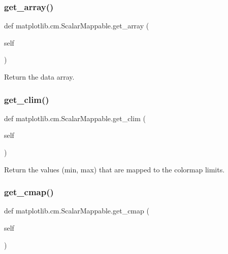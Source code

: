 \subsubsection{\texorpdfstring{get\+\_\+array()}{get\_array()}}
{\footnotesize\ttfamily def matplotlib.\+cm.\+Scalar\+Mappable.\+get\+\_\+array (\begin{DoxyParamCaption}\item[{}]{self }\end{DoxyParamCaption})}

\begin{DoxyVerb}Return the data array.\end{DoxyVerb}
 \mbox{\label{classmatplotlib_1_1cm_1_1ScalarMappable_a7d44743554ae7c7018cd88612c165ea0}} 
\subsubsection{\texorpdfstring{get\+\_\+clim()}{get\_clim()}}
{\footnotesize\ttfamily def matplotlib.\+cm.\+Scalar\+Mappable.\+get\+\_\+clim (\begin{DoxyParamCaption}\item[{}]{self }\end{DoxyParamCaption})}

\begin{DoxyVerb}Return the values (min, max) that are mapped to the colormap limits.
\end{DoxyVerb}
 \mbox{\label{classmatplotlib_1_1cm_1_1ScalarMappable_a64acb81e9faf893ea6bd3758367fd4e8}} 
\subsubsection{\texorpdfstring{get\+\_\+cmap()}{get\_cmap()}}
{\footnotesize\ttfamily def matplotlib.\+cm.\+Scalar\+Mappable.\+get\+\_\+cmap (\begin{DoxyParamCaption}\item[{}]{self }\end{DoxyParamCaption})}

